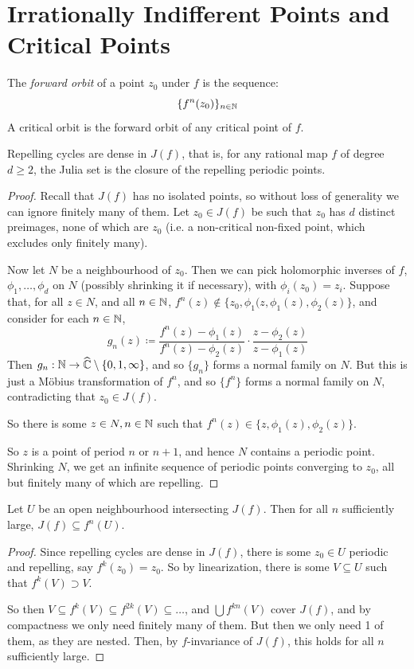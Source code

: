 \documentclass[10pt,a4paper]{article}
\begin{document}
\section{Irrationally Indifferent Points and Critical Points}
\begin{definition}
  The \emph{forward orbit} of a point $z_0$ under $f$ is the sequence:
  \[\{f^n(z_0)\}_{n \in \mathbb{N}}\]
  A critical orbit is the forward orbit of any critical point of $f$.
\end{definition}
\begin{theorem}
  Repelling cycles are dense in $J(f)$, that is, for any rational map $f$ of degree $d \geq 2$, the Julia set is the closure of the repelling periodic points.
\end{theorem}
\begin{proof}
  Recall that $J(f)$ has no isolated points, so without loss of generality we can ignore finitely many of them. Let $z_0 \in J(f)$ be such that $z_0$ has $d$ distinct preimages, none of which are $z_0$ (i.e. a non-critical non-fixed point, which excludes only finitely many).

  Now let $N$ be a neighbourhood of $z_0$. Then we can pick holomorphic inverses of $f$, $\phi_1, \ldots, \phi_d$ on $N$ (possibly shrinking it if necessary), with $\phi_i(z_0) = z_i$. Suppose that, for all $z \in N$, and all $n \in \mathbb{N}$, $f^n(z) \notin \{z_0, \phi_1(z, \phi_1(z), \phi_2(z)\}$, and consider for each $n \in \mathbb{N}$,
  \[g_n(z) \coloneqq \frac{f^n(z)-\phi_1(z)}{f^n(z)-\phi_2(z)}\cdot\frac{z-\phi_2(z)}{z-\phi_1(z)}\]
  Then $g_n:\mathbb{N} \to \widehat{\mathbb{C}}\setminus\{0, 1, \infty\}$, and so $\{g_n\}$ forms a normal family on $N$. But this is just a M\"obius transformation of $f^n$, and so $\{f^n\}$ forms a normal family on $N$, contradicting that $z_0 \in J(f)$.

  So there is some $z \in N, n \in \mathbb{N}$ such that $f^n(z) \in \{z, \phi_1(z), \phi_2(z)\}$.

  So $z$ is a point of period $n$ or $n+1$, and hence $N$ contains a periodic point. Shrinking $N$, we get an infinite sequence of periodic points converging to $z_0$, all but finitely many of which are repelling.
\end{proof}
\begin{corollary}
  Let $U$ be an open neighbourhood intersecting $J(f)$. Then for all $n$ sufficiently large, $J(f) \subseteq f^n(U)$.
\end{corollary}
\begin{proof}
  Since repelling cycles are dense in $J(f)$, there is some $z_0 \in U$ periodic and repelling, say $f^k(z_0) = z_0$. So by linearization, there is some $V \subseteq U$ such that $f^k(V) \supset V$.

  So then $V \subseteq f^k(V) \subseteq f^{2k}(V) \subseteq \ldots$, and $\bigcup f^{kn}(V)$ cover $J(f)$, and by compactness we only need finitely many of them. But then we only need 1 of them, as they are nested. Then, by $f$-invariance of $J(f)$, this holds for all $n$ sufficiently large.
\end{proof}
\end{document}
